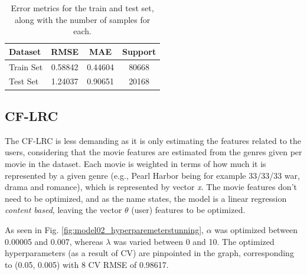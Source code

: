 \documentclass[conference]{IEEEtran}
\begin{document}
\begin{table}[H]
\centering
\caption{Error metrics for the train and test set, along with the number of samples for each.}
\label{tab:model01_results}
\begin{tabular}{lccc}
\toprule
\textbf{Dataset} & \textbf{RMSE} & \textbf{MAE} & \textbf{Support} \\
\midrule
Train Set & 0.58842 & 0.44604 & 80668 \\
Test Set & 1.24037 & 0.90651 & 20168 \\
\bottomrule
\end{tabular}
\end{table}

\subsection{CF-LRC}

The CF-LRC is less demanding as it is only estimating the features related to the users, considering that the movie features are estimated from the genres given per movie in the dataset. Each movie is weighted in terms of how much it is represented by a given genre (e.g., Pearl Harbor being for example 33/33/33 war, drama and romance), which is represented by vector \textit{x}. The movie features don't need to be optimized, and as the name states, the model is a linear regression \textit{content based}, leaving the vector \textit{$\theta$} (user) features to be optimized. 





As seen in Fig. \ref{fig:model02_hyperparemeterstunning}, $\alpha$ was optimized between 0.00005 and 0.007, whereas $\lambda$ was varied between 0 and 10. The optimized hyperparameters (as a result of CV) are pinpointed in the graph, corresponding to (0.05, 0.005) with 8 CV RMSE of 0.98617.
\end{document}

